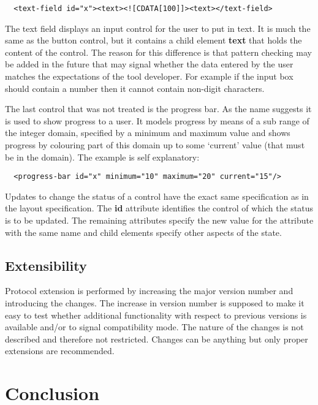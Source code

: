 \documentclass{article}
\begin{document}
    \begin{verbatim}
  <text-field id="x"><text><![CDATA[100]]><text></text-field>\end{verbatim}

   The text field displays an input control for the user to put in text. It is
   much the same as the button control, but it contains a child element
   \textbf{text} that holds the content of the control. The reason for this
   difference is that pattern checking may be added in the future that may
   signal whether the data entered by the user matches the expectations of the
   tool developer. For example if the input box should contain a number then it
   cannot contain non-digit characters.

   The last control that was not treated is the progress bar. As the name
   suggests it is used to show progress to a user. It models progress by means
   of a sub range of the integer domain, specified by a minimum and maximum
   value and shows progress by colouring part of this domain up to some
   `current' value (that must be in the domain). The example is self
   explanatory:

    \begin{verbatim}
  <progress-bar id="x" minimum="10" maximum="20" current="15"/>\end{verbatim}

   Updates to change the status of a control have the exact same specification
   as in the layout specification. The \textbf{id} attribute identifies the
   control of which the status is to be updated. The remaining attributes
   specify the new value for the attribute with the same name and child
   elements specify other aspects of the state.

  \subsection{Extensibility}

   Protocol extension is performed by increasing the major version number and
   introducing the changes. The increase in version number is supposed to make
   it easy to test whether additional functionality with respect to previous
   versions is available and/or to signal compatibility mode. The nature of the
   changes is not described and therefore not restricted. Changes can be
   anything but only proper extensions are recommended.

  \section{Conclusion}
\end{document}

